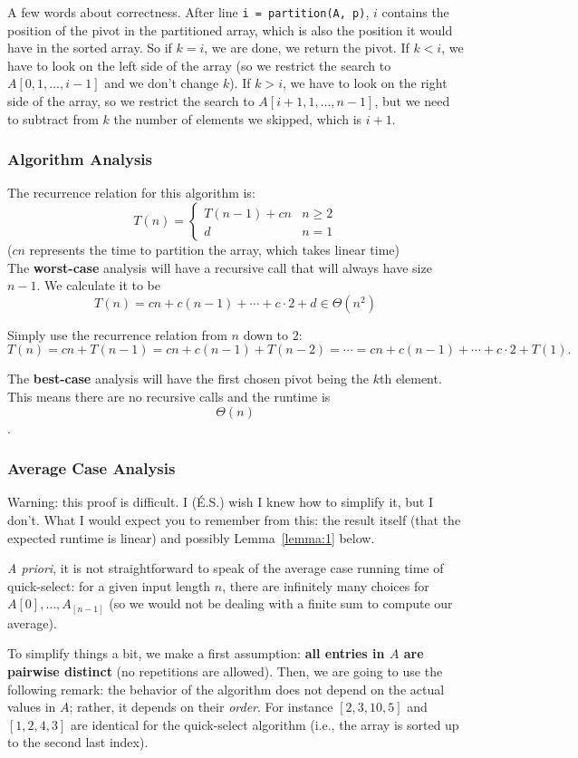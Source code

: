 \documentclass{report}
\newcommand{\prf}[1]{
\begin{tcolorbox}[width=\textwidth,title={Proof}]%
  {#1}%
\end{tcolorbox} %
}
\begin{document}
A few words about correctness. After line {\tt i = partition(A, p)},
$i$ contains the position of the pivot in the partitioned array, which is
also the position it would have in the sorted array. So if $k=i$, we are done,
we return the pivot. If $k < i$, we have to look on the left side of the array
(so we restrict the search to $A[0, 1, ..., i-1]$ and we don't change $k$).
If $k > i$, we have to look on the right side of the array,
so we restrict the search to $A[i+1, 1, ..., n-1]$, but we need to subtract
from $k$ the number of elements we skipped, which is $i+1$.

\subsubsection{Algorithm Analysis}
The recurrence relation for this algorithm is:
\[ T(n) = \begin{cases} 
      T(n-1) + cn & n \geq 2 \\
      d & n = 1
   \end{cases}
\]
($cn$ represents the time to partition the array, which takes linear time)\\
The \textbf{worst-case} analysis will have a recursive call that will always have size $n-1$. We calculate it to be
$$T(n) = cn + c(n-1) + \cdots + c\cdot 2 + d \in \Theta(n^2)$$
\prf{Simply use the recurrence relation from $n$ down to $2$:
$$T(n)=cn + T(n-1) = cn + c(n-1) + T(n-2) = \cdots = cn + c(n-1) + \cdots + c\cdot 2 + T(1).$$ }
The \textbf{best-case} analysis will have the first chosen pivot being the $k$th element. This means there are no recursive calls and the runtime is $$\Theta(n)$$.

\subsubsection{Average Case Analysis}

Warning: this proof is difficult. I (\'E.S.) wish I knew how to
simplify it, but I don't. What I would expect you to remember from
this: the result itself (that the expected runtime is linear) and
possibly Lemma~\ref{lemma:1} below.

{\it A priori}, it is not straightforward to speak of the average case
running time of quick-select: for a given input length $n$, there are
infinitely many choices for $A[0],\dots,A_[n-1]$ (so we would not be
dealing with a finite sum to compute our average). 

To simplify things a bit, we make a first assumption: {\bf all entries
  in $A$ are pairwise distinct} (no repetitions are allowed).
Then, we are going to use the following remark: the behavior of the
algorithm does not depend on the actual values in $A$; rather, it
depends on their \textit{order}. For instance $[2, 3, 10, 5]$ and $[1,
  2, 4, 3]$ are identical for the quick-select algorithm (i.e., the
array is sorted up to the second last index). 
\end{document}
